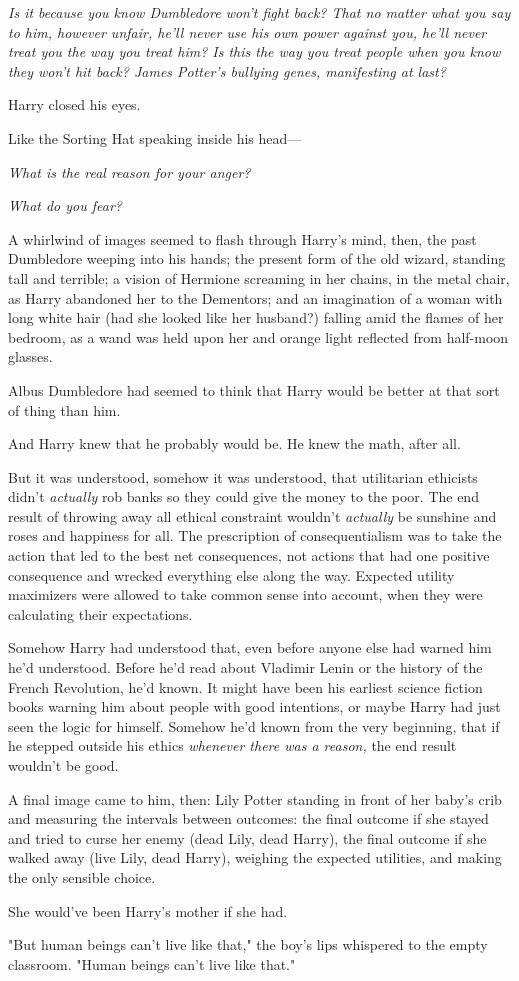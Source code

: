 \emph{Is it because you know Dumbledore won't fight back? That no matter what 
you say to him, however unfair, he'll never use his own power against you, 
he'll never treat you the way you treat him? Is this the way you treat people 
when you know they won't hit back? James Potter's bullying genes, manifesting 
at last?}

Harry closed his eyes.

Like the Sorting Hat speaking inside his head---

\emph{What is the real reason for your anger?}

\emph{What do you fear?}

A whirlwind of images seemed to flash through Harry's mind, then, the past 
Dumbledore weeping into his hands; the present form of the old wizard, standing 
tall and terrible; a vision of Hermione screaming in her chains, in the metal 
chair, as Harry abandoned her to the Dementors; and an imagination of a woman 
with long white hair (had she looked like her husband?) falling amid the flames 
of her bedroom, as a wand was held upon her and orange light reflected from 
half-moon glasses.

Albus Dumbledore had seemed to think that Harry would be better at that sort of 
thing than him.

And Harry knew that he probably would be. He knew the math, after all.

But it was understood, somehow it was understood, that utilitarian ethicists 
didn't \emph{actually} rob banks so they could give the money to the poor. The 
end result of throwing away all ethical constraint wouldn't \emph{actually} be 
sunshine and roses and happiness for all. The prescription of consequentialism 
was to take the action that led to the best net consequences, not actions that 
had one positive consequence and wrecked everything else along the way. 
Expected utility maximizers were allowed to take common sense into account, 
when they were calculating their expectations.

Somehow Harry had understood that, even before anyone else had warned him he'd 
understood. Before he'd read about Vladimir Lenin or the history of the French 
Revolution, he'd known. It might have been his earliest science fiction books 
warning him about people with good intentions, or maybe Harry had just seen the 
logic for himself. Somehow he'd known from the very beginning, that if he 
stepped outside his ethics \emph{whenever there was a reason,} the end result 
wouldn't be good.

A final image came to him, then: Lily Potter standing in front of her baby's 
crib and measuring the intervals between outcomes: the final outcome if she 
stayed and tried to curse her enemy (dead Lily, dead Harry), the final outcome 
if she walked away (live Lily, dead Harry), weighing the expected utilities, 
and making the only sensible choice.

She would've been Harry's mother if she had.

"But human beings can't live like that," the boy's lips whispered to the empty 
classroom. "Human beings can't live like that."
